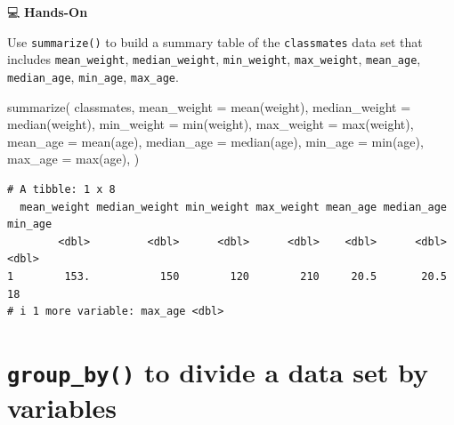 \documentclass[
  letterpaper,
  DIV=11,
  numbers=noendperiod]{scrreprt}
\newenvironment{Shaded}{\begin{snugshade}}{\end{snugshade}}
\newcommand{\AttributeTok}[1]{\textcolor[rgb]{0.40,0.45,0.13}{#1}}
\newcommand{\FunctionTok}[1]{\textcolor[rgb]{0.28,0.35,0.67}{#1}}
\newcommand{\NormalTok}[1]{\textcolor[rgb]{0.00,0.23,0.31}{#1}}
\begin{document}
💻 \textbf{Hands-On}

Use \texttt{summarize()} to build a summary table of the
\texttt{classmates} data set that includes \texttt{mean\_weight},
\texttt{median\_weight}, \texttt{min\_weight}, \texttt{max\_weight},
\texttt{mean\_age}, \texttt{median\_age}, \texttt{min\_age},
\texttt{max\_age}.

\begin{tcolorbox}[enhanced jigsaw, colbacktitle=quarto-callout-tip-color!10!white, opacitybacktitle=0.6, breakable, left=2mm, leftrule=.75mm, toprule=.15mm, toptitle=1mm, bottomtitle=1mm, colframe=quarto-callout-tip-color-frame, opacityback=0, coltitle=black, arc=.35mm, titlerule=0mm, colback=white, bottomrule=.15mm, title=\textcolor{quarto-callout-tip-color}{\faLightbulb}\hspace{0.5em}{Answer}, rightrule=.15mm]

\begin{Shaded}
\begin{Highlighting}[]
\FunctionTok{summarize}\NormalTok{(}
\NormalTok{  classmates,}
  \AttributeTok{mean\_weight =} \FunctionTok{mean}\NormalTok{(weight),}
  \AttributeTok{median\_weight =} \FunctionTok{median}\NormalTok{(weight),}
  \AttributeTok{min\_weight =} \FunctionTok{min}\NormalTok{(weight),}
  \AttributeTok{max\_weight =} \FunctionTok{max}\NormalTok{(weight),}
  \AttributeTok{mean\_age =} \FunctionTok{mean}\NormalTok{(age),}
  \AttributeTok{median\_age =} \FunctionTok{median}\NormalTok{(age),}
  \AttributeTok{min\_age =} \FunctionTok{min}\NormalTok{(age),}
  \AttributeTok{max\_age =} \FunctionTok{max}\NormalTok{(age),}
\NormalTok{)}
\end{Highlighting}
\end{Shaded}

\begin{verbatim}
# A tibble: 1 x 8
  mean_weight median_weight min_weight max_weight mean_age median_age min_age
        <dbl>         <dbl>      <dbl>      <dbl>    <dbl>      <dbl>   <dbl>
1        153.           150        120        210     20.5       20.5      18
# i 1 more variable: max_age <dbl>
\end{verbatim}

\end{tcolorbox}

\section{\texorpdfstring{\texttt{group\_by()} to divide a data set by
variables}{group\_by() to divide a data set by variables}}\label{group_by-to-divide-a-data-set-by-variables}
\end{document}
